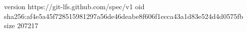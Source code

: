 version https://git-lfs.github.com/spec/v1
oid sha256:af4e5a45f728515981297a56de46deabe8f606f1ecca43a1d83e524d4d0575fb
size 207217
